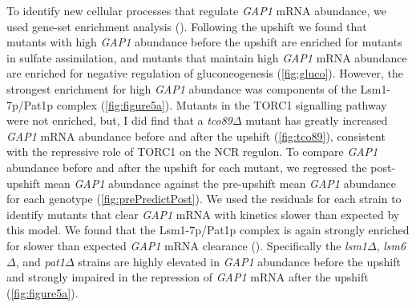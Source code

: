 To identify new cellular processes that regulate \textit{GAP1} mRNA abundance, we
used gene-set enrichment analysis ().
Following the upshift we found that mutants with high \textit{GAP1}
abundance before the upshift are enriched for mutants in sulfate
assimilation, and mutants that 
maintain high \textit{GAP1} mRNA abundance are enriched for negative
regulation of gluconeogenesis (\autoref{fig:gluco}).
However, the strongest enrichment for high \textit{GAP1} abundance 
was components of the Lsm1-7p/Pat1p complex (\autoref{fig:figure5a}). 
Mutants in the TORC1 signalling pathway were not enriched,
but, I did find that a \textit{tco89}$\Delta$ mutant has
greatly increased \textit{GAP1} mRNA abundance before and after the 
upshift (\autoref{fig:tco89}), consistent with the repressive role 
of TORC1 on the NCR regulon.
To compare \textit{GAP1} abundance before and after the upshift for each mutant,
we regressed the post-upshift mean \textit{GAP1} abundance against the pre-upshift 
mean \textit{GAP1} abundance for each genotype (\autoref{fig:prePredictPost}). 
We used the residuals for each
strain to identify mutants that clear \textit{GAP1} mRNA with kinetics slower
than expected by this model.
We found that the Lsm1-7p/Pat1p complex is again strongly 
enriched for slower than
expected \textit{GAP1} mRNA clearance (). 
Specifically
the \textit{lsm1}$\Delta$, \textit{lsm6}$\Delta$, and 
\textit{pat1}$\Delta$ strains are highly elevated in \textit{GAP1}
abundance before the upshift and strongly impaired in the 
repression of \textit{GAP1} mRNA after the upshift
(\autoref{fig:figure5a}). 

